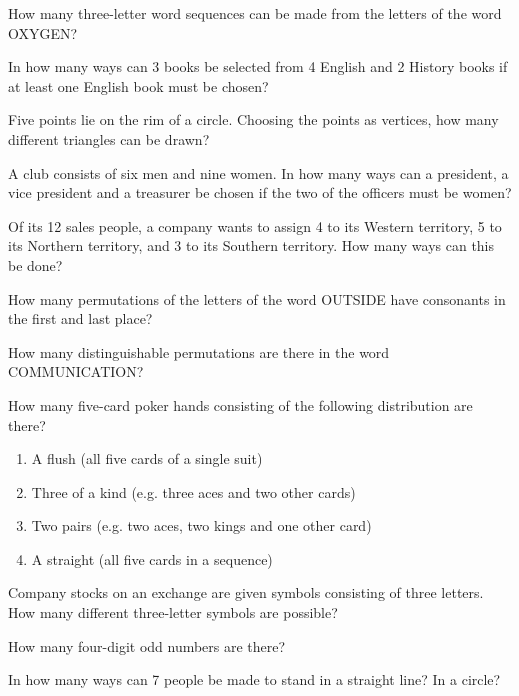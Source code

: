 \begin{puzzle}
    How many three-letter word sequences can be made from the letters of the word OXYGEN?
\end{puzzle}

\begin{puzzle}
    In how many ways can 3 books be selected from 4 English and 2 History books if at least one English book must be chosen?
\end{puzzle}

\begin{puzzle}
    Five points lie on the rim of a circle. Choosing the points as vertices, how many different triangles can be drawn?
\end{puzzle}

\begin{puzzle}
    A club consists of six men and nine women. In how many ways can a president, a vice president and a treasurer be chosen if the two of the officers must be women?
\end{puzzle}

\begin{puzzle}
    Of its 12 sales people, a company wants to assign 4 to its Western territory, 5 to its Northern territory, and 3 to its Southern territory. How many ways can this be done?
\end{puzzle}

\begin{puzzle}
    How many permutations of the letters of the word OUTSIDE have consonants in the first and last place?
\end{puzzle}

\begin{puzzle}
    How many distinguishable permutations are there in the word COMMUNICATION?
\end{puzzle}

\begin{puzzle}
    How many five-card poker hands consisting of the following distribution are there?
    \begin{enumerate}
        \item A flush (all five cards of a single suit)
        \item Three of a kind (e.g. three aces and two other cards)
        \item Two pairs (e.g. two aces, two kings and one other card)
        \item A straight (all five cards in a sequence)
    \end{enumerate}
\end{puzzle}

\begin{puzzle}
    Company stocks on an exchange are given symbols consisting of three letters. How many different three-letter symbols are possible?
\end{puzzle}

\begin{puzzle}
    How many four-digit odd numbers are there?
\end{puzzle}

\begin{puzzle}
    In how many ways can 7 people be made to stand in a straight line? In a circle?
\end{puzzle}

